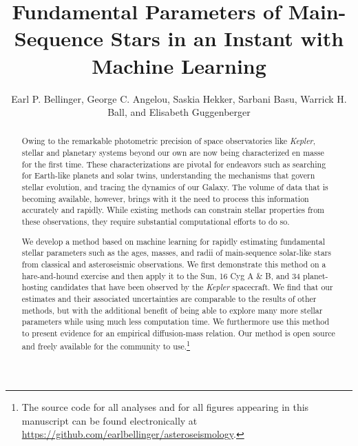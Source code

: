\documentclass[manuscript,linenumbers]{aastex6}
\begin{document}
\title{Fundamental Parameters of Main-Sequence Stars in an Instant with Machine Learning}

\author{Earl P. Bellinger, George C. Angelou, Saskia Hekker, Sarbani Basu, Warrick H. Ball, and Elisabeth Guggenberger}

\begin{abstract}
Owing to the remarkable photometric precision of space observatories like \emph{Kepler}, stellar and planetary systems beyond our own are now being characterized en masse for the first time. These characterizations are pivotal for endeavors such as searching for Earth-like planets and solar twins, understanding the mechanisms that govern stellar evolution, and tracing the dynamics of our Galaxy. The volume of data that is becoming available, however, brings with it the need to process this information accurately and rapidly. While existing methods can constrain stellar properties from these observations, they require substantial computational efforts to do so. 

We develop a method based on machine learning for rapidly estimating fundamental stellar parameters such as the ages, masses, and radii of main-sequence solar-like stars from classical and asteroseismic observations. We first demonstrate this method on a hare-and-hound exercise and then apply it to the Sun, 16 Cyg A \& B, and 34 planet-hosting candidates that have been observed by the \emph{Kepler} spacecraft. We find that our estimates and their associated uncertainties are comparable to the results of other methods, but with the additional benefit of being able to explore many more stellar parameters while using much less computation time. We furthermore use this method to present evidence for an empirical diffusion-mass relation. Our method is open source and freely available for the community to use.\footnote{The source code for all analyses and for all figures appearing in this manuscript can be found electronically at \url{https://github.com/earlbellinger/asteroseismology}.}
\end{abstract}
\end{document}
